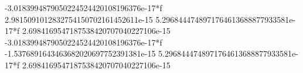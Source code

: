 -3.0183994879050224524420108196376e-17*f 2.9815091012832754150702161452611e-15 5.2968444748971764613688877933581e-17*f 2.6984169547187538420707040227106e-15 -3.0183994879050224524420108196376e-17*f -1.5376891643463682020697752391381e-15 5.2968444748971764613688877933581e-17*f 2.6984169547187538420707040227106e-15